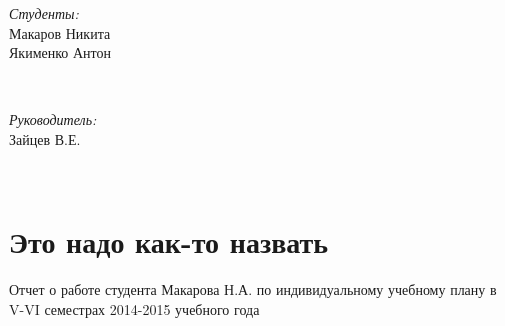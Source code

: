 \documentclass[a4paper,12pt]{article}
\begin{document}
\begin{titlepage}

\begin{minipage}{0.4\textwidth}
\begin{flushleft} \large
\emph{Студенты:}\\
Макаров Никита\\Якименко Антон
\end{flushleft}
\end{minipage}
~
\begin{minipage}{0.4\textwidth}
\begin{flushright} \large
\emph{Руководитель:} \\
Зайцев В.Е.
\end{flushright}
\end{minipage}\\[2cm]








\vfill %

\end{titlepage}



\section{Это надо как-то назвать}

Отчет о работе студента Макарова Н.А. по индивидуальному учебному плану в V-VI семестрах 2014-2015 учебного года 
\end{document}
